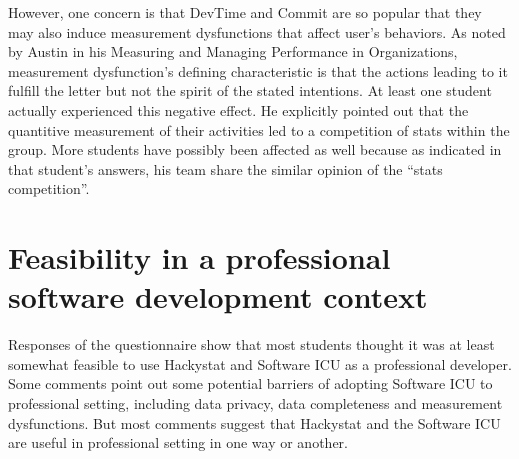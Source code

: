 However, one concern is that DevTime and Commit are so popular that they may also induce measurement dysfunctions that affect user's behaviors. As noted by Austin in his Measuring and Managing Performance in Organizations\cite{Austin96}, measurement dysfunction’s defining characteristic is that the actions leading to it fulfill the letter but not the spirit of the stated intentions. At least one student actually experienced this negative effect. He explicitly pointed out that the quantitive measurement of their activities led to a competition of stats within the group. More students have possibly been affected as well because as indicated in that student's answers, his team share the similar opinion of the ``stats competition''.

\section {Feasibility in a professional software development context}
Responses of the questionnaire show that most students thought it was at least somewhat feasible to use Hackystat and Software ICU as a professional developer. Some comments point out some potential barriers of adopting Software ICU to professional setting, including data privacy, data completeness and measurement dysfunctions. But most comments suggest that Hackystat and the Software ICU are useful in professional setting in one way or another.

